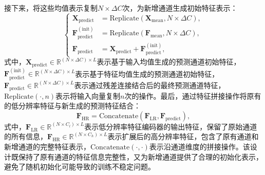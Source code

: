 接下来，将这些均值表示复制$N \times \Delta C$次，为新增通道生成初始特征表示：
\begin{equation}
\left\{
\begin{aligned}
\mathbf{X}_{\text{predict}} &= \mathrm{Replicate}\!\left(\mathbf{X}_{\text{mean}}, N \times \Delta C\right), \\
\mathbf{F}_{\text{predict}}^{(\text{init})} &= \mathrm{Replicate}\!\left(\mathbf{F}_{\text{mean}}, N \times \Delta C\right), \\
\mathbf{F}_{\text{predict}} &= \mathbf{X}_{\text{predict}} + \mathbf{F}_{\text{predict}}^{(\text{init})},
\end{aligned}
\right.
\label{eq:feature_replication}
\end{equation}
式中，$\mathbf{X}_{\text{predict}} \in \mathbb{R}^{(N \times \Delta C) \times L}$表示基于输入均值生成的预测通道初始特征，$\mathbf{F}_{\text{predict}}^{(\text{init})} \in \mathbb{R}^{(N \times \Delta C) \times L}$表示基于特征均值生成的预测通道初始特征，$\mathbf{F}_{\text{predict}} \in \mathbb{R}^{(N \times \Delta C) \times L}$表示通过残差连接结合后的最终预测通道特征，$\mathrm{Replicate}(\cdot, n)$表示将输入向量复制$n$次的操作。最后，通过特征拼接操作将原有的低分辨率特征与新生成的预测特征结合：
\begin{equation}
\mathbf{F}_{\text{HR}} = \mathrm{Concatenate}\!\left(\mathbf{F}_{\text{LR}}, \mathbf{F}_{\text{predict}}\right),
\label{eq:feature_concatenation}
\end{equation}
式中，$\mathbf{F}_{\text{LR}} \in \mathbb{R}^{(N \times C_l) \times L}$表示低分辨率特征编码器的输出特征，保留了原始通道的所有信息，$\mathbf{F}_{\text{HR}} \in \mathbb{R}^{(N \times C_h) \times L}$表示扩展后的高分辨率特征，包含了原有通道和新增通道的完整特征表示，$\mathrm{Concatenate}(\cdot, \cdot)$表示沿通道维度的拼接操作。该设计既保持了原有通道的特征信息完整性，又为新增通道提供了合理的初始化表示，避免了随机初始化可能导致的训练不稳定问题。

